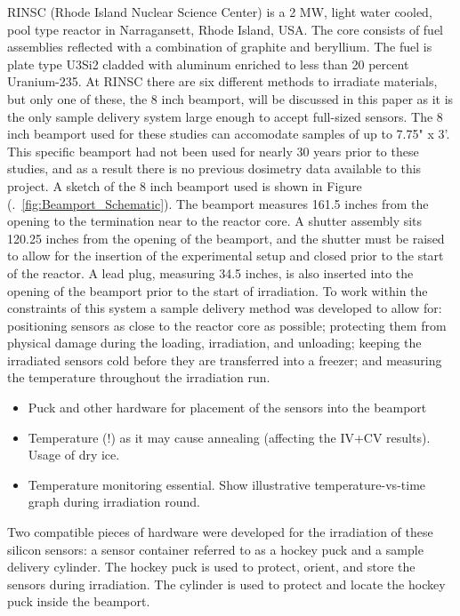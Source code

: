 RINSC (Rhode Island Nuclear Science Center) is a 2 MW, light water cooled, pool type reactor in Narragansett, Rhode Island, USA.
The core consists of fuel assemblies reflected with a combination of graphite and beryllium.
The fuel is plate type U3Si2 cladded with aluminum enriched to less than 20 percent Uranium-235.
At RINSC there are six different methods to irradiate materials, but only one of these, the 8 inch beamport, will be discussed in this paper as it is the only sample delivery system large enough to accept full-sized sensors.
The 8 inch beamport used for these studies can accomodate samples of up to 7.75" x 3'.
This specific beamport had not been used for nearly 30 years prior to these studies, and as a result there is no previous dosimetry data available to this project.
A sketch of the 8 inch beamport used is shown in Figure (.~\ref{fig:Beamport_Schematic}).
The beamport measures 161.5 inches from the opening to the termination near to the reactor core.
A shutter assembly sits 120.25 inches from the opening of the beamport, and the shutter must be raised to allow for the insertion of the experimental setup and closed prior to the start of the reactor.
A lead plug, measuring 34.5 inches, is also inserted into the opening of the beamport prior to the start of irradiation.
To work within the constraints of this system a sample delivery method was developed to allow for: positioning sensors as close to the reactor core as possible; protecting them from physical damage during the loading, irradiation, and unloading; keeping the irradiated sensors cold before they are transferred into a freezer; and measuring the temperature throughout the irradiation run.   

\begin{itemize}
  \item Puck and other hardware for placement of the sensors into the beamport
  \item Temperature (!) as it may cause annealing (affecting the IV+CV results). Usage of dry ice.
  \item Temperature monitoring essential. Show illustrative temperature-vs-time graph during irradiation round. 
\end{itemize}

Two compatible pieces of hardware were developed for the irradiation of these silicon sensors: a sensor container referred to as a hockey puck and a sample delivery cylinder. 
The hockey puck is used to protect, orient, and store the sensors during irradiation. 
The cylinder is used to protect and locate the hockey puck inside the beamport.

